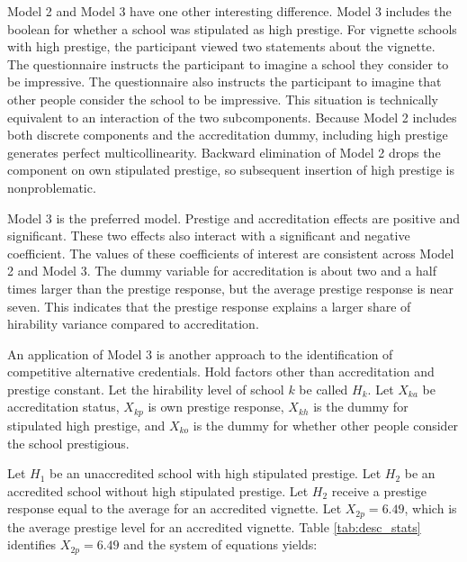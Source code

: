\documentclass[review]{elsarticle}
\begin{document}

Model 2 and Model 3 have one other interesting difference.
Model 3 includes the boolean for whether a school was stipulated as high prestige.
For vignette schools with high prestige, the participant viewed two statements about the vignette.
The questionnaire instructs the participant to imagine a school they consider to be impressive.
The questionnaire also instructs the participant to imagine that other people consider the school to be impressive.
This situation is technically equivalent to an interaction of the two subcomponents.
Because Model 2 includes both discrete components and the accreditation dummy, including high prestige generates perfect multicollinearity.
Backward elimination of Model 2 drops the component on own stipulated prestige, so subsequent insertion of high prestige is nonproblematic.

Model 3 is the preferred model.
Prestige and accreditation effects are positive and significant.
These two effects also interact with a significant and negative coefficient.
The values of these coefficients of interest are consistent across Model 2 and Model 3.
The dummy variable for accreditation is about two and a half times larger than the prestige response,
but the average prestige response is near seven.
This indicates that the prestige response explains a larger share of hirability variance compared to accreditation.

An application of Model 3 is another approach to the identification of competitive alternative credentials.
Hold factors other than accreditation and prestige constant.
Let the hirability level of school $k$ be called $H_k$.
Let $X_{ka}$ be accreditation status,
$X_{kp}$ is own prestige response,
$X_{kh}$ is the dummy for stipulated high prestige,
and $X_{ko}$ is the dummy for whether other people consider the school prestigious.

Let $H_1$ be an unaccredited school with high stipulated prestige.
Let $H_2$ be an accredited school without high stipulated prestige.
Let $H_2$ receive a prestige response equal to the average for an accredited vignette.
Let $X_{2p} = 6.49$, which is the average prestige level for an accredited vignette.
Table \ref{tab:desc_stats} identifies $X_{2p} = 6.49$ and the system of equations yields:
\end{document}
